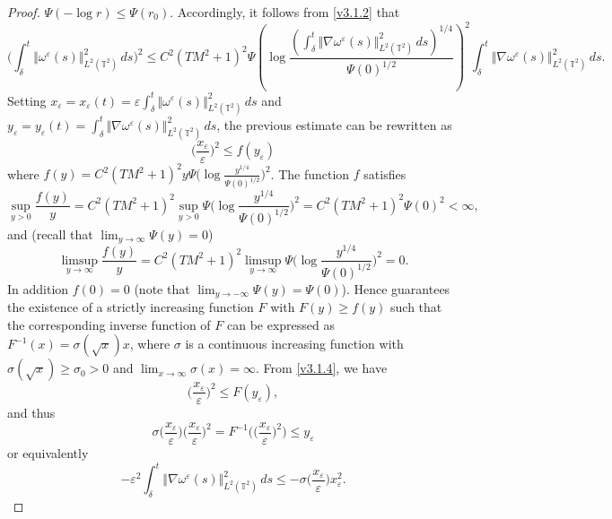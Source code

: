 \documentclass[11pt, a4paper,leqno]{amsart}
\theoremstyle{plain}
\numberwithin{equation}{section}
\theoremstyle{definition}
\theoremstyle{remark}
\def\T{\mathbb{T}}
\begin{document}
\begin{proof}
$\Psi(-\log r)\leq\Psi(r_{0})$. Accordingly, it follows from \eqref{v3.1.2}
that
\[
\bigg(\int_{\delta}^{t}\Vert\omega^{\varepsilon}(s)\Vert_{L^{2}(\T^2)}^{2}\,ds\bigg)^{2}\leq
C^{2}(TM^{2}+1)^{2}\Psi\left(  \log\frac{(\int_{\delta}^{t}\Vert\nabla
\omega^{\varepsilon}(s)\Vert_{L^{2}(\T^2)}^{2}\,ds)^{1/4}}{\Psi(0)^{1/2}}\right)  ^{2}%
\int_{\delta}^{t}\Vert\nabla\omega^{\varepsilon}(s)\Vert_{L^2(\T^2)}^{2}\,ds.
\]
Setting $x_{\varepsilon}=x_{\varepsilon}(t)=\varepsilon\int_{\delta}^{t}\Vert\omega^{\varepsilon}%
(s)\Vert_{L^{2}(\T^2)}^{2}\,ds$ and $y_{\varepsilon}=y_{\varepsilon}(t)=\int_{\delta}^{t}\Vert
\nabla\omega^{\varepsilon}(s)\Vert^{2}_{L^2(\T^2)}\,ds$, the previous estimate can be rewritten
as
\begin{equation}
\Big(\frac{x_{\varepsilon}}{\varepsilon}\Big)^{2}\leq f(y_{\varepsilon})\label{v3.1.4}%
\end{equation}
where $f(y)=C^{2}(TM^{2}+1)^{2}y\Psi\big(\log\frac{y^{1/4}}{\Psi(0)^{1/2}%
}\big)^{2}$. The function $f$ satisfies
\[
\sup_{y>0}\frac{f(y)}{y}=C^{2}(TM^{2}+1)^{2}\sup_{y>0}\Psi\bigg(\log
\frac{y^{1/4}}{\Psi(0)^{1/2}}\bigg)^{2}=C^{2}(TM^{2}+1)^{2}\Psi(0)^{2}<\infty,
\]
and (recall that $\lim_{y\rightarrow\infty}\Psi(y)=0$)
\[
\limsup_{y\rightarrow\infty}\frac{f(y)}{y}=C^{2}(TM^{2}+1)^{2}\limsup
_{y\rightarrow\infty}\Psi\bigg(\log\frac{y^{1/4}}{\Psi(0)^{1/2}}\bigg)^{2}=0.
\]
In addition $f(0)=0$ (note that $\lim_{y\rightarrow-\infty}\Psi(y)=\Psi(0)$).
Hence  \cite[Lemma C.1]{Lan} guarantees the
existence of a strictly increasing function $F$ with $F(y)\geq f(y)$ such that
the corresponding inverse function of $F$ can be expressed as $F^{-1}%
(x)=\sigma(\sqrt{x})x$, where $\sigma$ is a continuous increasing function
with $\sigma(\sqrt{x})\geq\sigma_{0}>0$ and $\lim_{x\rightarrow\infty}%
\sigma(x)=\infty$. From \eqref{v3.1.4}, we have
\[
\Big(\frac{x_{\varepsilon}}{\varepsilon}\Big)^{2}\leq F(y_{\varepsilon}),
\]
and thus
\[
\sigma\Big(\frac{x_{\varepsilon}}{\varepsilon}\Big)\Big(\frac{x_{\varepsilon}}{\varepsilon}\Big)^{2}%
=F^{-1}\Big(\Big(\frac{x_{\varepsilon}}{\varepsilon}\Big)^{2}\Big)\leq y_{\varepsilon}%
\]
or equivalently
\begin{equation}
-\varepsilon^{2}\int_{\delta}^{t}\Vert\nabla\omega^{\varepsilon}(s)\Vert_{L^2(\T^2)}^{2}\,ds\leq
-\sigma\Big(\frac{x_{\varepsilon}}{\varepsilon}\Big)x_{\varepsilon}^{2}.\label{v3.1.5}%
\end{equation}



\end{proof}
\end{document}
